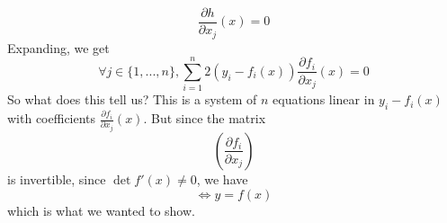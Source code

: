 \documentclass{article}
\newcommand{\prt}[2]{\frac{\partial #1}{\partial #2}}
\begin{document}
\begin{equation}\prt{h}{x_j}(x) = 0\end{equation}
Expanding, we get
\begin{equation}\forall j \in \{1,...,n\}, \sum_{i = 1}^n2(y_i - f_i(x))\prt{f_i}{x_j}(x) = 0\end{equation}
So what does this tell us? This is a system of \(n\) equations linear in \(y_i - f_i(x)\) with coefficients \(\prt{f_i}{x_j}(x)\). But since the matrix
\begin{equation}\left(\prt{f_i}{x_j}\right)\end{equation}
is invertible, since \(\det f'(x) \neq 0\), we have
\begin{equation}[\forall i \in \{1,...,n\}, (y_i - f_i(x)) = 0] \iff y = f(x)\end{equation}
which is what we wanted to show.
\end{document}
